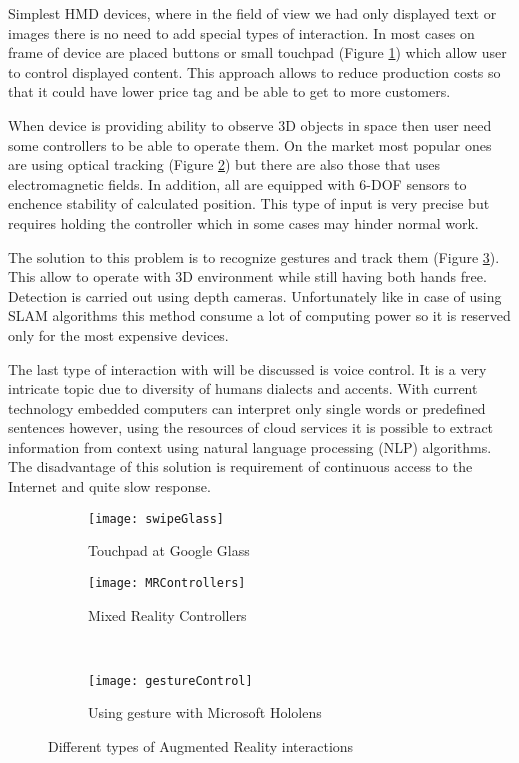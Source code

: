 \documentclass[printmode,en]{mgr}
\begin{document}
Simplest HMD devices, where in the field of view we had only displayed text or images there is no need to add special types of interaction. In most cases on frame of device are placed buttons or small touchpad (Figure \ref{fig:swipeGlass}) which allow user to control displayed content. This approach allows to reduce production costs so that it could have lower price tag and be able to get to more customers.

When device is providing ability to observe 3D objects in space then user need some controllers to be able to operate them. On the market most popular ones are using optical tracking (Figure \ref{fig:MRControllers}) but there are also those that uses electromagnetic fields. In addition, all are equipped with 6-DOF sensors to enchence stability of calculated position. This type of input is very precise but requires holding the controller which in some cases may hinder normal work.

The solution to this problem is to recognize gestures and track them (Figure \ref{fig:gestureControl}). This allow to operate with 3D environment while still having both hands free. Detection is carried out using depth cameras. Unfortunately like in case of using SLAM algorithms this method consume a lot of computing power so it is reserved only for the most expensive devices.

The last type of interaction with will be discussed is voice control. It is a very intricate topic due to diversity of humans dialects and accents. With current technology embedded computers can interpret only single words or predefined sentences however, using the resources of cloud services it is possible to extract information from context using natural language processing (NLP) algorithms. The disadvantage of this solution is requirement of continuous access to the Internet and quite slow response.

\begin{figure}[!ht]
\centering
\begin{subfigure}{.5\textwidth}
  \centering
  \texttt{[image: swipeGlass]}
  \caption{Touchpad at Google Glass}
  \label{fig:swipeGlass}
\end{subfigure}%
\begin{subfigure}{.5\textwidth}
  \centering
  \texttt{[image: MRControllers]}
  \caption{Mixed Reality Controllers}
  \label{fig:MRControllers}
\end{subfigure}\\
\begin{subfigure}{.5\textwidth}
  \centering
  \texttt{[image: gestureControl]}
  \caption{Using gesture with Microsoft Hololens}
  \label{fig:gestureControl}
\end{subfigure}%
\caption{Different types of Augmented Reality interactions}
\label{fig:ARInteraction}
\end{figure}
\end{document}
